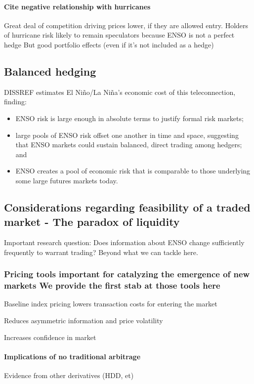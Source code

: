 \documentclass[authoryear]{article}
\begin{document}
\paragraph{Cite negative relationship with hurricanes}
Great deal of competition driving prices lower, if they are allowed entry.
Holders of hurricane risk likely to remain speculators because ENSO is not a perfect hedge 
But good portfolio effects (even if it's not included as a hedge)


\subsection{Balanced hedging}

DISSREF estimates El Ni\~no/La Ni\~na's economic cost of this teleconnection, finding:
\begin{itemize} 
\item ENSO risk is large enough in absolute terms to justify formal risk markets;
\item large pools of ENSO risk offset one another in time and space, suggesting that ENSO markets could sustain balanced, direct trading among hedgers; and 
\item ENSO creates a pool of economic risk that is comparable to those underlying some large futures markets today.
\end{itemize}

\subsection{Considerations regarding feasibility of a traded market - The paradox of liquidity}
Important research question: Does information about ENSO change sufficiently frequently to warrant trading? Beyond what we can tackle here.

\subsubsection{Pricing tools important for catalyzing the emergence of new markets
We provide the first stab at those tools here}

Baseline index pricing lowers transaction costs for entering the market

Reduces asymmetric information and price volatility

Increases confidence in market

\paragraph{Implications of no traditional arbitrage}
Evidence from other derivatives (HDD, et)
\end{document}
